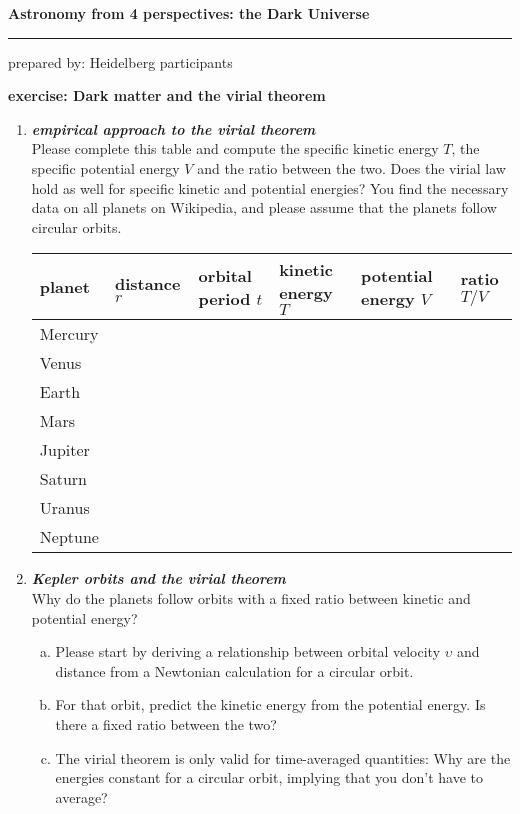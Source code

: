 \documentclass[a4paper,12pt]{article}
\newcommand{\question}[1]{\textbf{\textit{#1}}}
\newcommand{\HRule}{\rule{\linewidth}{0.3mm}}
\begin{document}
\pagestyle{empty}

\begin{center}
\LARGE \textbf{Astronomy from 4 perspectives: the Dark Universe}
\HRule
\end{center}
\begin{flushright}
prepared by: Heidelberg participants
\end{flushright}
\begin{center}
{\Large \textbf{exercise: Dark matter and the virial theorem}}
\end{center}
\vspace{5mm}

\begin{enumerate}

\item \question{empirical approach to the virial theorem}\\
Please complete this table and compute the specific kinetic energy $T$, the specific potential energy $V$ and the ratio between the two. Does the virial law hold as well for specific kinetic and potential energies? You find the necessary data on all planets on Wikipedia, and please assume that the planets follow circular orbits.

\begin{table}[h]
\begin{center}
\begin{tabular}{|l|ll|ll|l|}
\hline
planet & distance $r$ & orbital period $t$ & kinetic energy $T$ & potential energy $V$ & ratio $T/V$\\
\hline
Mercury & & & & & \\
Venus & & & & & \\
Earth & & & & & \\
Mars & & & & & \\
Jupiter & & & & & \\
Saturn & & & & & \\
Uranus & & & & & \\
Neptune & & & & & \\
\hline
\end{tabular}
\end{center}
\end{table}

\item \question{Kepler orbits and the virial theorem}\\
Why do the planets follow orbits with a fixed ratio between kinetic and potential energy?
\begin{enumerate}[(a)]
\item{Please start by deriving a relationship between orbital velocity $\upsilon$ and distance from a Newtonian calculation for a circular orbit.}
\item{For that orbit, predict the kinetic energy from the potential energy. Is there a fixed ratio between the two?}
\item{The virial theorem is only valid for time-averaged quantities: Why are the energies constant for a circular orbit, implying that you don't have to average?}
\end{enumerate}



\end{enumerate}
\end{document}
